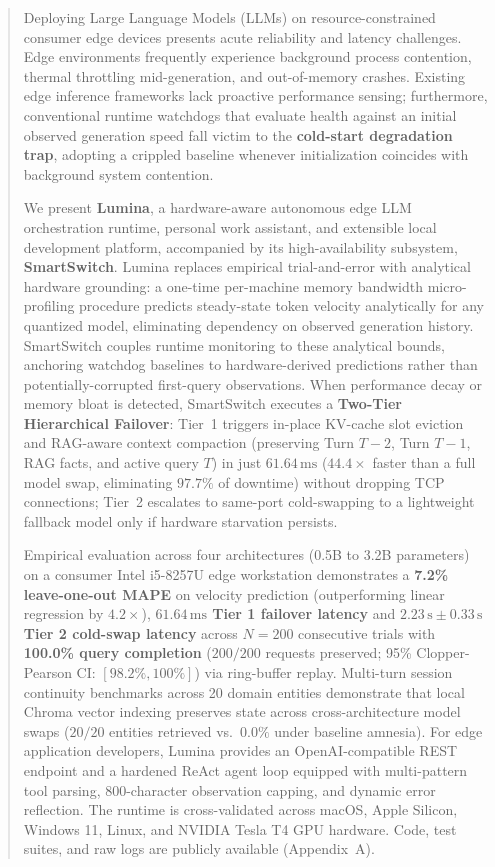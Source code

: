 \documentclass[11pt,a4paper]{article}
\newcommand{\su}{\,\mathrm{s}}
\begin{document}
\begin{abstract}
\noindent
Deploying Large Language Models (LLMs) on resource-constrained consumer edge devices presents acute reliability and latency challenges. Edge environments frequently experience background process contention, thermal throttling mid-generation, and out-of-memory crashes. Existing edge inference frameworks lack proactive performance sensing; furthermore, conventional runtime watchdogs that evaluate health against an initial observed generation speed fall victim to the \textbf{cold-start degradation trap}, adopting a crippled baseline whenever initialization coincides with background system contention.

\medskip\noindent
We present \textbf{Lumina}, a hardware-aware autonomous edge LLM orchestration runtime, personal work assistant, and extensible local development platform, accompanied by its high-availability subsystem, \textbf{SmartSwitch}. Lumina replaces empirical trial-and-error with analytical hardware grounding: a one-time per-machine memory bandwidth micro-profiling procedure predicts steady-state token velocity analytically for any quantized model, eliminating dependency on observed generation history. SmartSwitch couples runtime monitoring to these analytical bounds, anchoring watchdog baselines to hardware-derived predictions rather than potentially-corrupted first-query observations. When performance decay or memory bloat is detected, SmartSwitch executes a \textbf{Two-Tier Hierarchical Failover}: Tier~1 triggers in-place KV-cache slot eviction and RAG-aware context compaction (preserving Turn $T-2$, Turn $T-1$, RAG facts, and active query $T$) in just \textbf{$61.64\,\mathrm{ms}$} ($44.4\times$ faster than a full model swap, eliminating $97.7\%$ of downtime) without dropping TCP connections; Tier~2 escalates to same-port cold-swapping to a lightweight fallback model only if hardware starvation persists.

\medskip\noindent
Empirical evaluation across four architectures (0.5B to 3.2B parameters) on a consumer Intel i5-8257U edge workstation demonstrates a \textbf{7.2\% leave-one-out MAPE} on velocity prediction (outperforming linear regression by $4.2\times$), \textbf{$61.64\,\mathrm{ms}$ Tier 1 failover latency} and \textbf{$2.23\su \pm 0.33\su$ Tier 2 cold-swap latency} across $N=200$ consecutive trials with \textbf{100.0\% query completion} ($200/200$ requests preserved; 95\% Clopper-Pearson CI: $[98.2\%, 100\%]$) via ring-buffer replay. Multi-turn session continuity benchmarks across 20 domain entities demonstrate that local Chroma vector indexing preserves state across cross-architecture model swaps ($20/20$ entities retrieved vs.\ $0.0\%$ under baseline amnesia). For edge application developers, Lumina provides an OpenAI-compatible REST endpoint and a hardened ReAct agent loop equipped with multi-pattern tool parsing, 800-character observation capping, and dynamic error reflection. The runtime is cross-validated across macOS, Apple Silicon, Windows 11, Linux, and NVIDIA Tesla T4 GPU hardware. Code, test suites, and raw logs are publicly available (Appendix~A).
\end{abstract}
\end{document}
